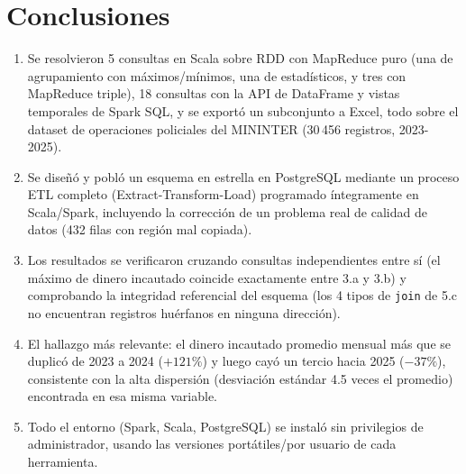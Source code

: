 \documentclass[10pt,a4paper]{article}
\theoremstyle{definition}
\begin{document}
\section{Conclusiones}
\begin{enumerate}
  \item Se resolvieron 5 consultas en Scala sobre RDD con MapReduce puro (una de agrupamiento con
    m\'aximos/m\'inimos, una de estad\'isticos, y tres con MapReduce triple), 18 consultas con la API de
    DataFrame y vistas temporales de Spark SQL, y se export\'o un subconjunto a Excel, todo sobre el
    dataset de operaciones policiales del MININTER (30\,456 registros, 2023-2025).
  \item Se dise\~n\'o y pobl\'o un esquema en estrella en PostgreSQL mediante un proceso ETL completo
    (Extract-Transform-Load) programado \'integramente en Scala/Spark, incluyendo la correcci\'on de un
    problema real de calidad de datos (432 filas con regi\'on mal copiada).
  \item Los resultados se verificaron cruzando consultas independientes entre s\'i (el m\'aximo de dinero
    incautado coincide exactamente entre 3.a y 3.b) y comprobando la integridad referencial del esquema
    (los 4 tipos de \texttt{join} de 5.c no encuentran registros hu\'erfanos en ninguna direcci\'on).
  \item El hallazgo m\'as relevante: el dinero incautado promedio mensual m\'as que se duplic\'o de 2023 a
    2024 ($+121\%$) y luego cay\'o un tercio hacia 2025 ($-37\%$), consistente con la alta dispersi\'on
    (desviaci\'on est\'andar 4.5 veces el promedio) encontrada en esa misma variable.
  \item Todo el entorno (Spark, Scala, PostgreSQL) se instal\'o sin privilegios de administrador,
    usando las versiones port\'atiles/por usuario de cada herramienta.
\end{enumerate}
\end{document}
